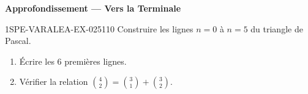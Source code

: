 \begin{center}\textbf{Approfondissement — Vers la Terminale}\end{center}
\begin{exercice}{1SPE-VARALEA-EX-025}{1}{10}
Construire les lignes $n = 0$ à $n = 5$ du triangle de Pascal.

\begin{enumerate}
  \item Écrire les $6$ premières lignes.
  \item Vérifier la relation $\binom{4}{2} = \binom{3}{1} + \binom{3}{2}$.
\end{enumerate}
\end{exercice}

